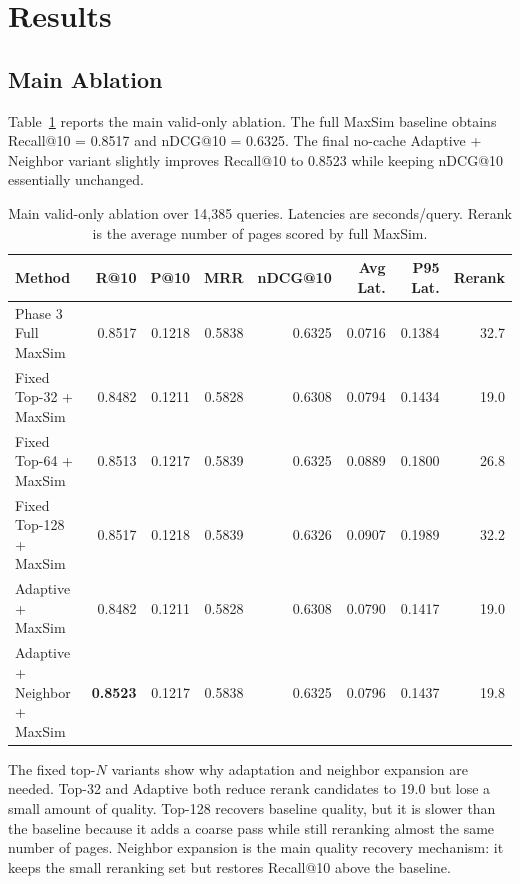 \documentclass[11pt]{article}
\begin{document}
\section{Results}

\subsection{Main Ablation}

Table~\ref{tab:main} reports the main valid-only ablation. The full MaxSim baseline obtains Recall@10 = 0.8517 and nDCG@10 = 0.6325. The final no-cache Adaptive + Neighbor variant slightly improves Recall@10 to 0.8523 while keeping nDCG@10 essentially unchanged.

\begin{table}[t]
\centering
\small
\begin{tabular}{lrrrrrrr}
\toprule
Method & R@10 & P@10 & MRR & nDCG@10 & Avg Lat. & P95 Lat. & Rerank \\
\midrule
Phase 3 Full MaxSim & 0.8517 & 0.1218 & 0.5838 & 0.6325 & 0.0716 & 0.1384 & 32.7 \\
Fixed Top-32 + MaxSim & 0.8482 & 0.1211 & 0.5828 & 0.6308 & 0.0794 & 0.1434 & 19.0 \\
Fixed Top-64 + MaxSim & 0.8513 & 0.1217 & 0.5839 & 0.6325 & 0.0889 & 0.1800 & 26.8 \\
Fixed Top-128 + MaxSim & 0.8517 & 0.1218 & 0.5839 & 0.6326 & 0.0907 & 0.1989 & 32.2 \\
Adaptive + MaxSim & 0.8482 & 0.1211 & 0.5828 & 0.6308 & 0.0790 & 0.1417 & 19.0 \\
Adaptive + Neighbor + MaxSim & \textbf{0.8523} & 0.1217 & 0.5838 & 0.6325 & 0.0796 & 0.1437 & 19.8 \\
\bottomrule
\end{tabular}
\caption{Main valid-only ablation over 14,385 queries. Latencies are seconds/query. Rerank is the average number of pages scored by full MaxSim.}
\label{tab:main}
\end{table}

The fixed top-$N$ variants show why adaptation and neighbor expansion are needed. Top-32 and Adaptive both reduce rerank candidates to 19.0 but lose a small amount of quality. Top-128 recovers baseline quality, but it is slower than the baseline because it adds a coarse pass while still reranking almost the same number of pages. Neighbor expansion is the main quality recovery mechanism: it keeps the small reranking set but restores Recall@10 above the baseline.
\end{document}
